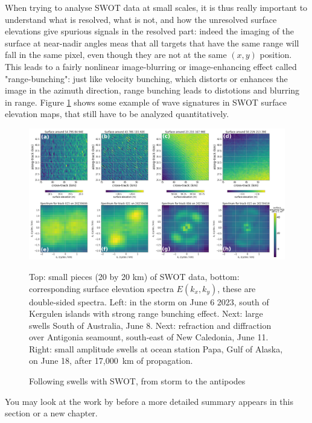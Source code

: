 When trying to analyse SWOT data at small scales, it is thus really important to understand what is resolved, what is not, and how the unresolved surface elevations give spurious signals in the resolved part: indeed the imaging of the surface at near-nadir angles meas that all targets that have the same range will fall in the same pixel, even though they are not at the same $(x,y)$ position. This leads to a fairly nonlinear image-blurring or image-enhancing effect called "range-bunching": just like velocity bunching, which distorts or enhances the image in the azimuth direction, range bunching leads to distotions and blurring in range. Figure \ref{fig:SWOTswell} shows some example of wave signatures in SWOT surface elevation maps, that still have to be analyzed quantitatively.
\begin{figure}[htb]
\centerline{\includegraphics[width=\textwidth]{FIGS_CH_SAT/SWOTSWELL.pdf}}
\caption{Following swells with SWOT, from storm to the antipodes}{Top: small pieces (20 by 20 km) of SWOT data, bottom: corresponding surface elevation spectra $E(k_x,k_y)$, these are double-sided spectra. Left: in the storm on June 6 2023, south of Kergulen islands with strong range bunching effect. Next: large swells South of Australia, June 8. Next: refraction and diffraction over Antigonia seamount, south-east of New Caledonia, June 11. Right: small amplitude swells at ocean station Papa, Gulf of Alaska, on June 18, after 17,000~km of propagation.}
\label{fig:SWOTswell}
\end{figure}
You may look at the work by \cite{Peral&al.2015} before a more detailed summary appears in this section or a new chapter. 

